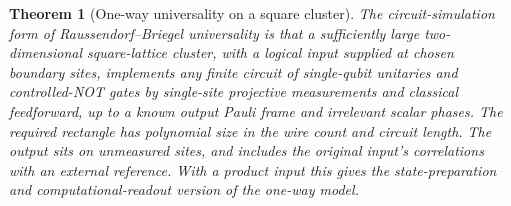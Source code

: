 \documentclass[aps,pra,onecolumn,superscriptaddress,nofootinbib,10pt]{revtex4-2}
\newtheorem{theorem}{Theorem}
\theoremstyle{definition}
\theoremstyle{remark}
\begin{document}
\begin{theorem}[One-way universality on a square cluster]\label{cp:universal}
The circuit-simulation form of Raussendorf--Briegel universality is that a sufficiently large two-dimensional square-lattice cluster, with a logical input supplied at chosen boundary sites, implements any finite circuit of single-qubit unitaries and controlled-NOT gates by single-site projective measurements and classical feedforward, up to a known output Pauli frame and irrelevant scalar phases. The required rectangle has polynomial size in the wire count and circuit length. The output sits on unmeasured sites, and includes the original input's correlations with an external reference. With a product input this gives the state-preparation and computational-readout version of the one-way model. \cite{n5-rb,n5-rbb}
\end{theorem}
\end{document}
